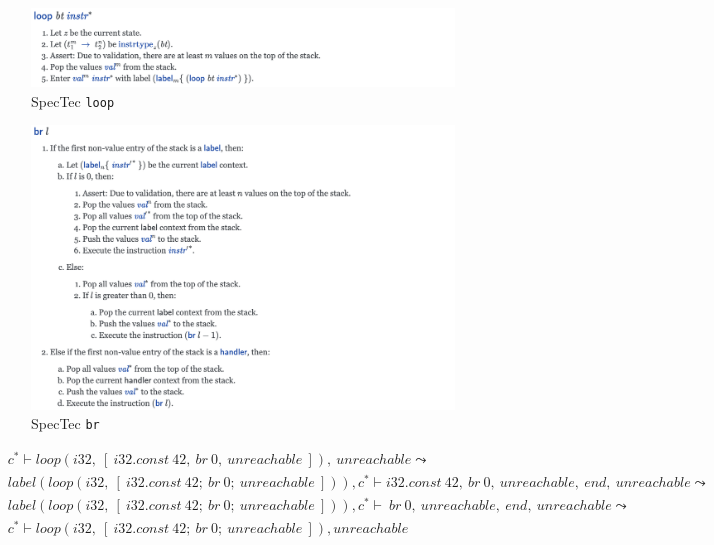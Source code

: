\begin{figure}[h!]
    \centerline{\includegraphics[width=15cm]{fig/spectec-loop}}
    \caption[Enter the caption title here]{SpecTec \texttt{loop}} \label{fig:spectec-loop}
\end{figure}
\begin{figure}[h!]
    \centerline{\includegraphics[width=15cm]{fig/spectec-br}}
    \caption[Enter the caption title here]{SpecTec \texttt{br}} \label{fig:spectec-br}
\end{figure}

\begin{align}
  &c^*
  \vdash
  loop(i32, ~ [ ~ i32.const ~ 42, ~ br ~ 0, ~ unreachable ~ ]), ~ unreachable
\leadsto \\
  &label(loop(i32, ~ [ ~ i32.const ~ 42; ~ br ~ 0; ~ unreachable ~ ])), c^*
  \vdash
  i32.const ~ 42, ~ br ~ 0, ~ unreachable, ~ end, ~ unreachable
\leadsto \\
  &label(loop(i32, ~ [ ~ i32.const ~ 42; ~ br ~ 0; ~ unreachable ~ ])), c^*
  \vdash
  ~ br ~ 0, ~ unreachable, ~ end, ~ unreachable
\leadsto \\
  &c^*
  \vdash
  loop(i32, ~ [ ~ i32.const ~ 42; ~ br ~ 0; ~ unreachable ~ ]), unreachable \\
\end{align}

